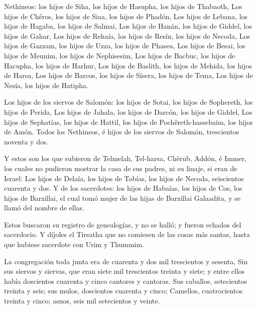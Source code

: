  Nethineos: los hijos de Siha, los hijos de Hasupha, los
hijos de Thabaoth,  Los hijos de Chêros, los hijos de
Siaa, los hijos de Phadón,  Los hijos de Lebana, los
hijos de Hagaba, los hijos de Salmai,  Los hijos de
Hanán, los hijos de Giddel, los hijos de Gahar,  Los
hijos de Rehaía, los hijos de Resín, los hijos de Necoda,
 Los hijos de Gazzam, los hijos de Uzza, los hijos de
Phasea,  Los hijos de Besai, los hijos de Meunim, los
hijos de Nephisesim,  Los hijos de Bacbuc, los hijos de
Hacupha, los hijos de Harhur,  Los hijos de Baslith, los
hijos de Mehida, los hijos de Harsa,  Los hijos de
Barcos, los hijos de Sísera, los hijos de Tema,  Los
hijos de Nesía, los hijos de Hatipha.

 Los hijos de los siervos de Salomón: los hijos de Sotai,
los hijos de Sophereth, los hijos de Perida,  Los hijos
de Jahala, los hijos de Darcón, los hijos de Giddel,  Los
hijos de Sephatías, los hijos de Hattil, los hijos de
Pochêreth-hassebaim, los hijos de Amón.  Todos los
Nethineos, é hijos de los siervos de Salomón, trescientos noventa y dos.

 Y estos son los que subieron de Telmelah, Tel-harsa,
Chêrub, Addón, é Immer, los cuales no pudieron mostrar la casa de sus
padres, ni su linaje, si eran de Israel:  Los hijos de
Delaía, los hijos de Tobías, los hijos de Necoda, seiscientos cuarenta y
dos.  Y de los sacerdotes: los hijos de Habaías, los
hijos de Cos, los hijos de Barzillai, el cual tomó mujer de las hijas de
Barzillai Galaadita, y se llamó del nombre de ellas.

 Estos buscaron su registro de genealogías, y no se
halló; y fueron echados del sacerdocio.  Y díjoles el
Tirsatha que no comiesen de las cosas más santas, hasta que hubiese
sacerdote con Urim y Thummim.

 La congregación toda junta era de cuarenta y dos mil
trescientos y sesenta,  Sin sus siervos y siervas, que
eran siete mil trescientos treinta y siete; y entre ellos había
doscientos cuarenta y cinco cantores y cantoras.  Sus
caballos, setecientos treinta y seis; sus mulos, doscientos cuarenta y
cinco;  Camellos, cuatrocientos treinta y cinco; asnos,
seis mil setecientos y veinte.

